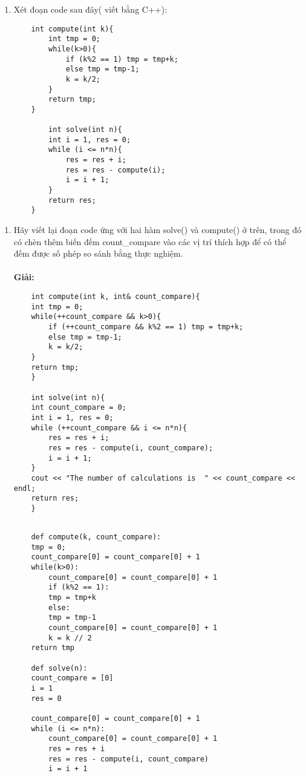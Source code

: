 \documentclass[12pt,a4paper]{article}
\begin{document}
        \begin{enumerate}[label=\textbf{Câu 3:} ]
    \item  Xét đoạn code sau đây( viết bằng C++):
          \begin{lstlisting}
    int compute(int k){
        int tmp = 0;
        while(k>0){
            if (k%2 == 1) tmp = tmp+k;
            else tmp = tmp-1;
            k = k/2;
        }
        return tmp;
    }

        int solve(int n){
        int i = 1, res = 0;
        while (i <= n*n){
            res = res + i;
            res = res - compute(i);
            i = i + 1;
        }
        return res;
    }
\end{lstlisting}
\end{enumerate}
\begin{enumerate}[label=\textbf{Câu 3.\arabic*},leftmargin=*]
    \item Hãy viết lại đoạn code ứng với hai hàm solve() và compute() ở trên, trong đó có
          chèn thêm biến đếm count\_compare vào các vị trí thích hợp để có thể đếm được
          số phép so sánh bằng thực nghiệm.\\ \\ \textbf{Giải:}
          \begin{lstlisting}
    int compute(int k, int& count_compare){
    int tmp = 0;
    while(++count_compare && k>0){   
        if (++count_compare && k%2 == 1) tmp = tmp+k;
        else tmp = tmp-1;
        k = k/2;
    }
    return tmp;
    }

    int solve(int n){
    int count_compare = 0;  
    int i = 1, res = 0;
    while (++count_compare && i <= n*n){  
        res = res + i;
        res = res - compute(i, count_compare);
        i = i + 1;
    }
    cout << "The number of calculations is  " << count_compare << endl;
    return res;
    }
\end{lstlisting}
          \begin{lstlisting}

    def compute(k, count_compare):
    tmp = 0;
    count_compare[0] = count_compare[0] + 1 
    while(k>0):
        count_compare[0] = count_compare[0] + 1 
        if (k%2 == 1):
        tmp = tmp+k
        else:
        tmp = tmp-1
        count_compare[0] = count_compare[0] + 1 
        k = k // 2
    return tmp

    def solve(n):
    count_compare = [0]
    i = 1
    res = 0

    count_compare[0] = count_compare[0] + 1 
    while (i <= n*n):
        count_compare[0] = count_compare[0] + 1 
        res = res + i
        res = res - compute(i, count_compare)
        i = i + 1


\end{lstlisting}
\end{enumerate}
\end{document}
